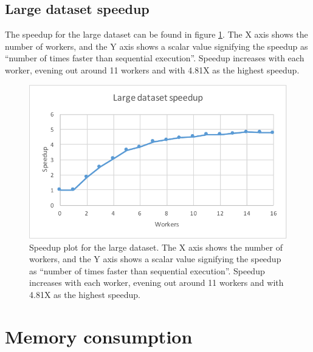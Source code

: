 \subsection{Large dataset speedup}
The speedup for the large dataset can be found in figure \ref{fig:dataset_4_speedup}.
The X axis shows the number of workers, and the Y axis shows a scalar value signifying the speedup as
``number of times faster than sequential execution''. Speedup increases with each worker, evening out around 11 workers and with 4.81X as the highest speedup.
\begin{figure}[ht]
  \centering
  \includegraphics[width=120mm]{figures/dataset_4/dataset_4_speedup.pdf}
  \caption[Speedup plot for the large dataset.]{Speedup plot for the large dataset. The X axis shows the number of workers, and the Y axis shows a scalar value signifying the speedup as
  ``number of times faster than sequential execution''. Speedup increases with each worker, evening out around 11 workers and with 4.81X as the highest speedup.}
  \label{fig:dataset_4_speedup}
\end{figure}

\FloatBarrier

\section{Memory consumption}


